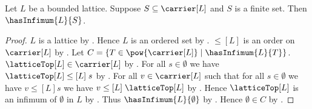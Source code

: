 \begin{theorem}\label{finite_subset_has_infimum}
    Let $L$ be a bounded lattice.
    Suppose $S\subseteq\carrier[L]$ and $S$ is a finite set.
    Then $\hasInfimum{L}{S}$.
\end{theorem}
\begin{proof}
    $L$ is a lattice by .
    Hence $L$ is an ordered set by .
    $\leq[L]$ is an order on $\carrier[L]$ by
        .
    Let $C=\{T\in\pow{\carrier[L]}\mid
        \hasInfimum{L}{T}\}$.
    $\latticeTop[L]\in\carrier[L]$ by .
    For all $s\in\emptyset$ we have
        $\latticeTop[L]\mathrel{\leq[L]}s$ by .
    For all $v\in\carrier[L]$ such that
        for all $s\in\emptyset$ we have $v\mathrel{\leq[L]}s$ we have
        $v\mathrel{\leq[L]}\latticeTop[L]$ by
        .
    Hence $\latticeTop[L]$ is an infimum of $\emptyset$ in $L$ by
        .
    Thus $\hasInfimum{L}{\emptyset}$ by .
    Hence $\emptyset\in C$ by .


\end{proof}
